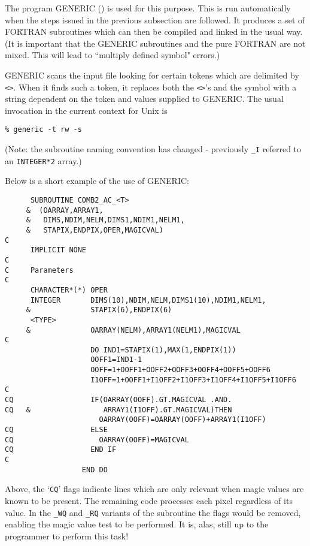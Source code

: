 The program GENERIC () is used for this purpose. This is run automatically
when the steps issued in the previous subsection are followed. It produces a
set of FORTRAN subroutines which can then be compiled and linked in the usual
way. (It is important that the GENERIC subroutines and the pure FORTRAN are not
mixed. This will lead to ``multiply defined symbol" errors.)

GENERIC scans the input file looking for certain tokens which are delimited
by {\tt <>}. When it finds such a token, it replaces both the {\tt <>}'s and 
the symbol with a string dependent on the token and values supplied to 
GENERIC. The usual invocation in the current context for Unix is

\begin{myquote}
\begin{verbatim}
% generic -t rw -s
\end{verbatim}
\end{myquote}

(Note: the subroutine naming convention has changed - previously {\tt\_I}
referred to an {\tt INTEGER*2} array.)

Below is a short example of the use of GENERIC:

\begin{myquote}
\begin{verbatim}
      SUBROUTINE COMB2_AC_<T>
     &  (OARRAY,ARRAY1,
     &   DIMS,NDIM,NELM,DIMS1,NDIM1,NELM1,
     &   STAPIX,ENDPIX,OPER,MAGICVAL)
C
      IMPLICIT NONE
C
C     Parameters
C                                                       
      CHARACTER*(*) OPER
      INTEGER       DIMS(10),NDIM,NELM,DIMS1(10),NDIM1,NELM1,
     &              STAPIX(6),ENDPIX(6)
      <TYPE>
     &              OARRAY(NELM),ARRAY1(NELM1),MAGICVAL
C
                    DO IND1=STAPIX(1),MAX(1,ENDPIX(1))
                    OOFF1=IND1-1
                    OOFF=1+OOFF1+OOFF2+OOFF3+OOFF4+OOFF5+OOFF6
                    I1OFF=1+OOFF1+I1OFF2+I1OFF3+I1OFF4+I1OFF5+I1OFF6
C
CQ                  IF(OARRAY(OOFF).GT.MAGICVAL .AND. 
CQ   &                 ARRAY1(I1OFF).GT.MAGICVAL)THEN
                      OARRAY(OOFF)=OARRAY(OOFF)+ARRAY1(I1OFF)
CQ                  ELSE
CQ                    OARRAY(OOFF)=MAGICVAL
CQ                  END IF
C
                  END DO
\end{verbatim}
\end{myquote}

Above, the `{\tt CQ}' flags indicate lines which are only relevant when magic
values are known to be present. The remaining code processes each pixel 
regardless of its value. In the {\tt \_WQ} and {\tt \_RQ} variants of the 
subroutine the flags would be removed, enabling the magic value test to be 
performed. It is, alas, still up to the programmer to perform this task!

